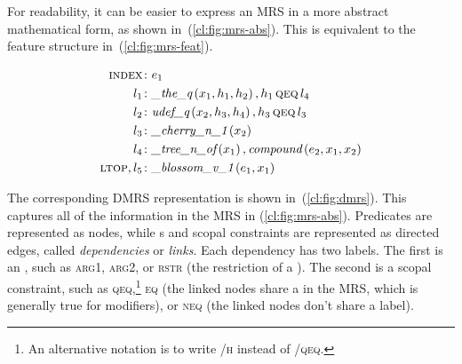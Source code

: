 \documentclass[output=paper
	        ,collection
	        ,collectionchapter
 	        ,biblatex
                ,babelshorthands
                ,newtxmath
                ,draftmode
                ,colorlinks, citecolor=brown
]{langscibook}
\begin{document}
For readability, it can be easier to express an MRS
in a more abstract mathematical form, as shown in~(\ref{cl:fig:mrs-abs}).
This is equivalent to the feature structure in~(\ref{cl:fig:mrs-feat}).

\begin{exe}
	\setlength{\abovedisplayskip}{1ex}
	\setlength{\belowdisplayskip}{1ex}
	\ex\label{cl:fig:mrs-abs}
	\begin{minipage}[c]{.6\textwidth}
	\vspace*{-1\baselineskip}
	\begin{align*}
	    \textsc{index}\colon & e_1 \\
		l_1\colon & \textit{\_the\_q}\left(x_1,h_1,h_2\right), h_1 \,\textsc{qeq}\, l_4 \\
		l_2\colon & \textit{udef\_q}\left(x_2,h_3,h_4\right), h_3 \,\textsc{qeq}\, l_3 \\
		l_3\colon & \textit{\_cherry\_n\_1}\left(x_2\right) \\
		l_4\colon & \textit{\_tree\_n\_of}\left(x_1\right), \textit{compound}\left(e_2,x_1,x_2\right) \\
		\textsc{ltop}, l_5\colon & \textit{\_blossom\_v\_1}\left(e_1,x_1\right)
	\end{align*}
	\end{minipage}
\end{exe}

The corresponding DMRS
representation is shown in~(\ref{cl:fig:dmrs}).
This captures all of the information
in the MRS in (\ref{cl:fig:mrs-abs}).
Predicates are represented as nodes,
while s and scopal constraints are represented as directed edges,
called \textit{dependencies} or \textit{links}.
Each dependency has two labels.
The first is an ,
such as \textsc{arg1}, \textsc{arg2},
or \textsc{rstr} (the restriction of a ).
The second is a scopal constraint,
such as \textsc{qeq},\footnote{%
	An alternative notation is to write
	\textsc{/h} instead of \textsc{/qeq}.
}
\textsc{eq} (the linked nodes share a  in the MRS,
which is generally true for modifiers),
or \textsc{neq} (the linked nodes don't share a label).
\end{document}
